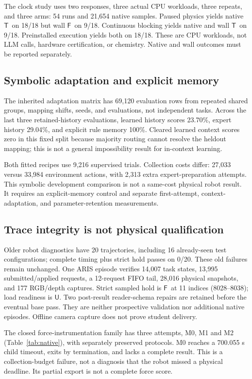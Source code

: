 \documentclass{article}
\newcommand{\True}{\ensuremath{\mathsf{T}}}
\newcommand{\False}{\ensuremath{\mathsf{F}}}
\newcommand{\Unk}{\ensuremath{\mathsf{U}}}
\begin{document}
The clock study uses two responses, three actual CPU workloads, three repeats, and three arms: 54 runs and 21,654 native samples. Paused physics yields native \True\ on 18/18 but wall \False\ on 9/18. Continuous blocking yields native and wall \True\ on 9/18. Preinstalled execution yields both on 18/18. These are CPU workloads, not LLM calls, hardware certification, or chemistry. Native and wall outcomes must be reported separately.

\subsection{Symbolic adaptation and explicit memory}
The inherited adaptation matrix has 69,120 evaluation rows from repeated shared groups, mapping shifts, seeds, and evaluations, not independent tasks. Across the last three retained-history evaluations, learned history scores 23.70\%, expert history 29.04\%, and explicit rule memory 100\%. Cleared learned context scores zero in this fixed split because majority routing cannot resolve the heldout mapping; this is not a general impossibility result for in-context learning.

Both fitted recipes use 9,216 supervised trials. Collection costs differ: 27,033 versus 33,984 environment actions, with 2,313 extra expert-preparation attempts. This symbolic development comparison is not a same-cost physical robot result. It requires an explicit-memory control and separate first-attempt, context-adaptation, and parameter-retention measurements.

\subsection{Trace integrity is not physical qualification}
Older robot diagnostics have 20 trajectories, including 16 already-seen test configurations; complete timing plus strict hold passes on 0/20. These old failures remain unchanged. One ARIS episode verifies 14,007 task states, 13,995 submitted/applied requests, a 12-request FIFO tail, 28,016 physical snapshots, and 177 RGB/depth captures. Strict sampled hold is \False\ at 11 indices (8028--8038); load readiness is \Unk. Two post-result reader-schema repairs are retained before the eventual base pass. They are neither prospective validation nor additional native episodes. Offline camera capture does not prove student delivery.

The closed force-instrumentation family has three attempts, M0, M1 and M2 (Table~\ref{tab:native}), with separately preserved protocols. M0 reaches a 700.055 s child timeout, exits by termination, and lacks a complete result. This is a collection-budget failure, not a diagnosis that the robot missed a physical deadline. Its partial export is not a complete force score.
\end{document}
